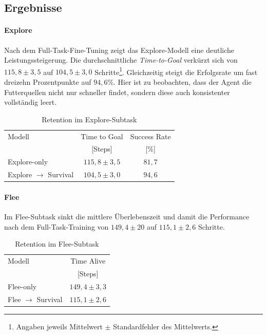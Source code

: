 \subsection{Ergebnisse}

\paragraph{Explore}
Nach dem Full-Task-Fine-Tuning zeigt das Explore-Modell eine deutliche Leistungssteigerung.  
Die durchschnittliche \emph{Time-to-Goal} verkürzt sich von $115{,}8 \pm 3{,}5$ auf $104{,}5 \pm 3{,}0$ Schritte\footnote{Angaben jeweils Mittelwert $\pm$ Standardfehler des Mittelwerts.}. Gleichzeitig steigt die Erfolgsrate um fast dreizehn Prozentpunkte auf $94{,}6\%$. Hier ist zu beobachten, dass der Agent die Futterquellen nicht nur schneller findet, sondern diese auch konsistenter vollständig leert. 

\begin{table}[H]
  \centering\footnotesize
  \setlength{\tabcolsep}{4pt}
  \caption{Retention im Explore-Subtask}
  \begin{tabular}{@{}lcc@{}}
    \toprule
    Modell                     & Time to Goal & Success Rate \\
                               & [Steps]      & [\%]         \\ 
    \midrule
    Explore-only               & $115{,}8 \pm 3{,}5$ & $81{,}7$  \\
    Explore \(\rightarrow\) Survival & $104{,}5 \pm 3{,}0$ & $94{,}6$  \\
    \bottomrule
  \end{tabular}
\end{table}

\paragraph{Flee}
Im Flee-Subtask sinkt die mittlere Überlebenszeit und damit die Performance nach dem Full-Task-Training von $149{,}4 \pm 20$ auf $115{,}1 \pm 2{,}6$ Schritte. 
\begin{table}[H]
  \centering\footnotesize
  \setlength{\tabcolsep}{4pt}
  \caption{Retention im Flee-Subtask}
  \begin{tabular}{@{}lc@{}}
    \toprule
    Modell                     & Time Alive  \\ 
                                & [Steps]   \\ 
    \midrule
    Flee-only                  & $149{,}4 \pm 3{,}3$    \\
    Flee \(\rightarrow\) Survival    & $115{,}1 \pm 2{,}6$  \\
    \bottomrule
  \end{tabular}
\end{table}

